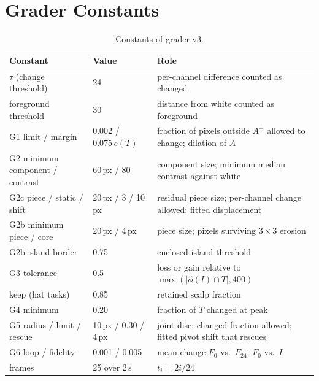 \documentclass[11pt]{article}
\newcommand{\chk}[1]{\textsf{#1}}
\begin{document}
\section{Grader Constants}
\begin{table}[h]
\centering
\small
\begin{tabularx}{\linewidth}{llL}
\toprule
Constant & Value & Role \\
\midrule
$\tau$ (change threshold) & 24 & per-channel difference counted as changed \\
foreground threshold & 30 & distance from white counted as foreground \\
\chk{G1} limit / margin & 0.002 / $0.075\,e(T)$ & fraction of pixels outside $A^{+}$ allowed to change; dilation of $A$ \\
\chk{G2} minimum component / contrast & 60\,px / 80 & component size; minimum median contrast against white \\
\chk{G2c} piece / static / shift & 20\,px / 3 / 10\,px & residual piece size; per-channel change allowed; fitted displacement \\
\chk{G2b} minimum piece / core & 20\,px / 4\,px & piece size; pixels surviving $3\times3$ erosion \\
\chk{G2b} island border & 0.75 & enclosed-island threshold \\
\chk{G3} tolerance & 0.5 & loss or gain relative to $\max(|\phi(I)\cap T|, 400)$ \\
keep (hat tasks) & 0.85 & retained scalp fraction \\
\chk{G4} minimum & 0.20 & fraction of $T$ changed at peak \\
\chk{G5} radius / limit / rescue & 10\,px / 0.30 / 4\,px & joint disc; changed fraction allowed; fitted pivot shift that rescues \\
\chk{G6} loop / fidelity & 0.001 / 0.005 & mean change $F_0$ vs.\ $F_{24}$; $F_0$ vs.\ $I$ \\
frames & 25 over 2\,s & $t_i = 2i/24$ \\
\bottomrule
\end{tabularx}
\caption{Constants of grader v3.}
\label{tab:thresholds}
\end{table}
\end{document}
